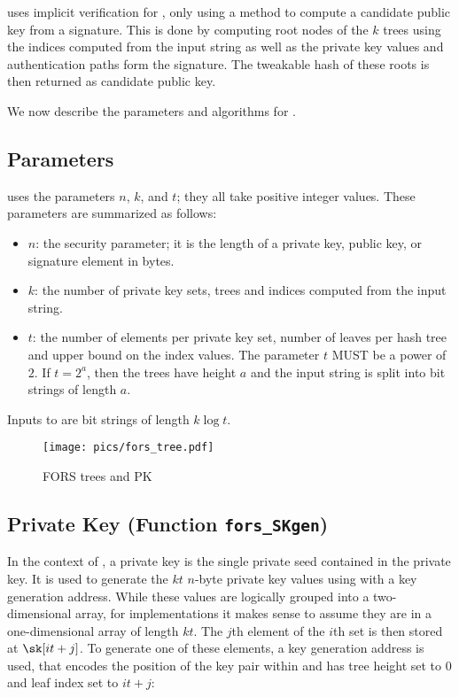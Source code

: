 \spx uses implicit verification for \fors, only using a method to compute
a candidate public key from a signature. This is done by computing root nodes
of the $k$ trees using the indices computed from the input string as well as
the private key values and authentication paths form the signature. The
tweakable hash of these roots is then returned as candidate public key.

%
We now describe the parameters and algorithms for \fors.

\subsection{\fors Parameters}\label{sec:fors:params}
\fors uses the parameters $n$, $k$, and $t$; they all take positive integer
values.
These parameters are summarized as follows:
\begin{itemize}
  \item $n$: the security parameter; it is the length of a private key, public
  key, or signature element in bytes.
  \item $k$: the number of private key sets, trees and indices computed
  from the input string.
  \item $t$: the number of elements per private key set, number of leaves per
  hash tree and upper bound on the index values. The parameter $t$ MUST
  be a power of $2$. If $t = 2^a$, then the trees have height $a$ and the
  input string is split into bit strings of length $a$.
\end{itemize}
Inputs to \fors are bit strings of length $k\log t$.

\begin{figure}[htb]
\texttt{[image: pics/fors\_tree.pdf]}
\caption{FORS trees and PK}
\end{figure}

\subsection{\fors Private Key (Function \texttt{fors\_SKgen})}
In the context of \spx, a \fors private key is the single private seed \sseed
contained in the \spx private key. It is used to generate the $kt$ $n$-byte
private key values using \sphincsPRF with a \fors key generation address. While these values are
logically grouped into a two-dimensional array, for implementations it makes sense to assume they
are in a one-dimensional array of length $kt$.
The $j$th element of the $i$th set is then stored at $\sk[it + j]$.
To generate one of these elements, a \fors key generation address \skadrs is used, that encodes the
position of the \fors key pair within \spx and has
tree height set to $0$ and leaf index set to $it+j$:

